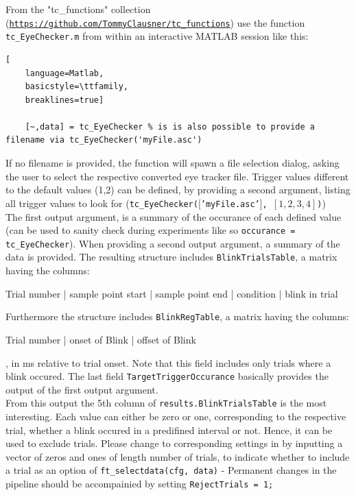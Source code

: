\documentclass[12pt,a4paper]{scrartcl}
\begin{document}
From the "tc\_functions" collection (\href{https://github.com/TommyClausner/tc_functions}{\nolinkurl{https://github.com/TommyClausner/tc_functions}}) use the function \texttt{tc\_EyeChecker.m} from within an interactive MATLAB session like this:
\begin{lstlisting}[
    language=Matlab,
    basicstyle=\ttfamily,
    breaklines=true]

    [~,data] = tc_EyeChecker % is is also possible to provide a filename via tc_EyeChecker('myFile.asc')
\end{lstlisting}
If no filename is provided, the function will spawn a file selection dialog, asking the user to select the respective converted eye tracker file. Trigger values different to the default values (1,2) can be defined, by providing a second argument, listing all trigger values to look for (\texttt{tc\_EyeChecker($[$'myFile.asc'$]$, $[1,2,3,4]$)})\\

The first output argument, is a summary of the occurance of each defined value (can be used to sanity check during experiments like so \texttt{occurance = tc\_EyeChecker}). When providing a second output argument, a summary of the data is provided. The resulting structure includes \texttt{BlinkTrialsTable}, a matrix having the columns:\\
\begin{center}
  Trial number | sample point start | sample point end | condition | blink in trial
\end{center}
Furthermore the structure includes \texttt{BlinkRegTable}, a matrix having the columns:\\
\begin{center}
  Trial number | onset of Blink | offset of Blink
\end{center}
, in ms relative to trial onset. Note that this field includes only trials where a blink occured. The last field \texttt{TargetTriggerOccurance} basically provides the output of the first output argument.\\

\noindent From this output the 5th column of \texttt{results.BlinkTrialsTable} is the most interesting. Each value can either be zero or one, corresponding to the respective trial, whether a blink occured in a predifined interval or not. Hence, it can be used to exclude trials. Please change to corresponding settings in  by inputting a vector of zeros and ones of length number of trials, to indicate whether to include a trial as an option of \texttt{ft\_selectdata(cfg, data)} - Permanent changes in the pipeline should be accompainied by setting \texttt{RejectTrials = 1;}
\end{document}
